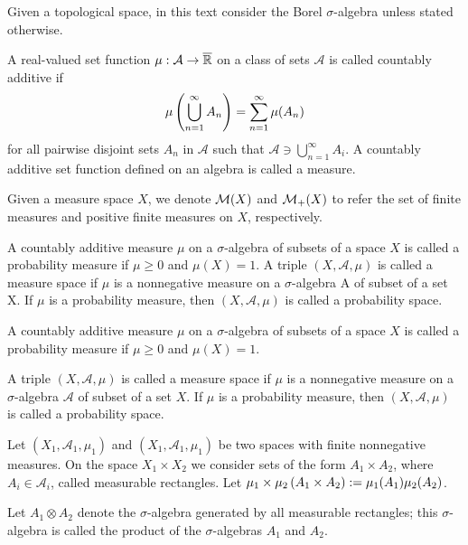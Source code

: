 Given a topological space, in this text consider the Borel $\sigma$-algebra unless stated otherwise. 

\begin{definition}[Measure]
	A real-valued set function $\mu:\mathcal{A}\rightarrow \overline{\mathbb{R}}$ on a class of sets $\mathcal A$ is called countably additive if 
	\begin{equation*}
		\mu\left( \bigcup_{n=1}^{\infty} A_n \right)=\sum_{n=1}^{\infty}\mu(A_n)
	\end{equation*}
	for all pairwise disjoint sets $A_n$ in $\mathcal A$ such that $\mathcal A \ni \bigcup_{n=1}^{\infty}A_i$. A countably additive set function defined on an algebra is called a measure.
\end{definition}

Given a measure space $X$, we denote $\mathcal{M}(X)$ and $\mathcal{M}_+(X)$ to refer the set of finite measures and positive finite measures on $X$, respectively. 

\begin{definition}
	A countably additive measure $\mu$ on a $\sigma$-algebra of subsets of a space $X$ is called a probability measure if $\mu\geq 0$ and $\mu(X)=1$.
	A triple $(X, \mathcal A, \mu)$ is called a measure space if $\mu$ is a
	nonnegative measure on a $\sigma$-algebra A of subset of a set X. If $\mu$ is a probability measure, then $(X, \mathcal A, \mu)$ is called a probability space. 
\end{definition}


\begin{definition}
\end{definition}

\begin{definition}
\end{definition}

\begin{definition}[Probability]
	A countably additive measure $\mu$ on a $\sigma$-algebra of subsets of a space $X$ is called a probability measure if $\mu \geq 0$ and $\mu(X)= 1$.
	
	A triple $(X, \mathcal A, \mu )$ is called a measure space if $\mu$ is a
	nonnegative measure on a $\sigma$-algebra $\mathcal A$ of subset of a set $X$. If $\mu$ is a probability measure, then $(X, \mathcal A, \mu)$ is called a probability space.
\end{definition}

\begin{definition}
Let $\left(X_1 , \mathcal{A}_1 , \mu_1 \right)$ and $\left(X_1 , \mathcal{A}_1 , \mu_1 \right)$ be two spaces with finite nonnegative measures. On the space $X_1\times X_2$ we consider sets of the form $A_1\times A_2$, where $A_i \in \mathcal{A}_i$, called measurable rectangles. Let $\mu_1\times \mu_2 \left( A_1\times A_2 \right):= \mu_1(A_1)\mu_2(A_2)$. 

Let $A_1\otimes A_2$ denote the $\sigma$-algebra generated by all measurable rectangles; this $\sigma$-algebra is called the product of the $\sigma$-algebras $A_1$ and $A_2$.  

\end{definition}

